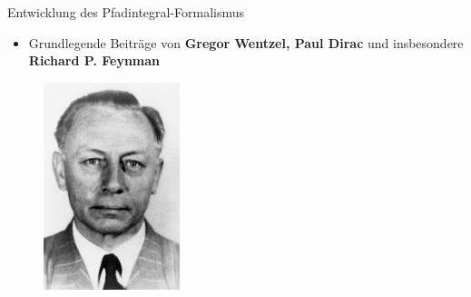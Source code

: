\begin{frame}{Entwicklung des Pfadintegral-Formalismus}

\begin{itemize}
	\item Grundlegende Beiträge von \textbf{Gregor Wentzel, Paul Dirac} und insbesondere \textbf{Richard P. Feynman}
\end{itemize}

\begin{figure}[H]
	\begin{minipage}{0.275\textwidth}
	\includegraphics[width = \textwidth]{figures/wentzel}	
	\end{minipage}
	\begin{minipage}{0.315\textwidth}

\end{minipage}
\end{figure}
\end{frame}
